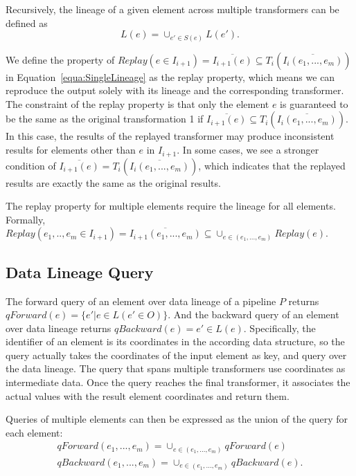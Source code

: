 \documentclass{sig-alternate}
\begin{document}
Recursively, the lineage of a given element across multiple transformers can be defined as
\begin{equation}
L(e) = \cup_{e' \in S(e)} L(e').
\end{equation}

We define the property of $Replay(e \in I_{i+1}) = \overline{I_{i+1}(e)} \subseteq T_i(\overline{I_i(e_1, ..., e_m)})$ in Equation~\ref{equa:SingleLineage}
as the replay property, which means we can reproduce the output solely with its lineage and the corresponding transformer.
The constraint of the replay property is that only the element $e$ is guaranteed to be the same as the original transformation 1
if $\overline{I_{i+1}(e)} \subseteq T_i(\overline{I_i(e_1, ..., e_m)})$. In this case, the results of the replayed transformer may
produce inconsistent results for elements other than $e$ in $I_{i+1}$. 
In some cases, we see a stronger condition of $\overline{I_{i+1}(e)} = T_i(\overline{I_i(e_1, ..., e_m)})$, which indicates that
the replayed results are exactly the same as the original results.

The replay property for multiple elements require the lineage for all elements. Formally,
$Replay(e_1,..,e_m \in I_{i+1}) = \overline{I_{i+1}(e_1,...,e_m)} \subseteq \cup_{e \in (e_1,...,e_m)} Replay(e) $.

\subsection{Data Lineage Query}
The forward query of an element over data lineage of a pipeline $P$ returns $qForward(e) = \{e' | e \in L(e' \in O)\}$. 
And the backward query of an element over data lineage returns $qBackward(e) = e' \in L(e)$.
Specifically, the identifier of an element is its coordinates in the according data structure, so the query actually takes
the coordinates of the input element as key, and query over the data lineage. The query that spans multiple transformers 
use coordinates as intermediate data. Once the query reaches the final transformer, it associates the actual values
with the result element coordinates and return them.

Queries of multiple elements can then be expressed as the union of the query for each element: 
\begin{equation}
\begin{split}
qForward(e_1, ..., e_m) = \cup_{e \in (e_1, ..., e_m)} qForward(e) \\
qBackward(e_1, ..., e_m) = \cup_{e \in (e_1, ..., e_m)} qBackward(e).
\end{split}
\end{equation}
\end{document}
